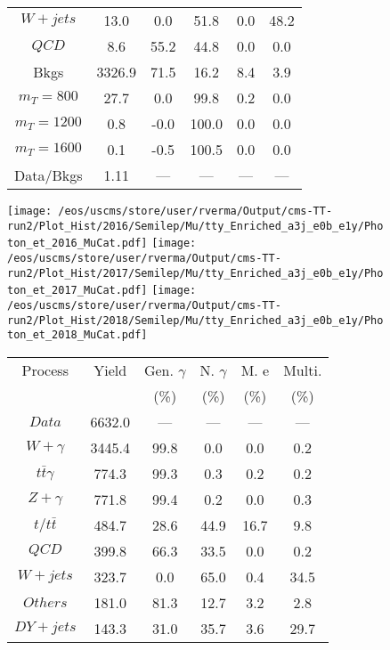 \begin{figure}
\begin{minipage}[c]{0.32\textwidth}
{\begin{tabular}{cccccc}
$ W+jets $ &  13.0 &  0.0 &  51.8 &  0.0 &  48.2\\
$ QCD $ &  8.6 &  55.2 &  44.8 &  0.0 &  0.0\\
Bkgs &  3326.9 &  71.5 &  16.2 &  8.4 &  3.9\\
$ m_{T} = 800 $ &  27.7 &  0.0 &  99.8 &  0.2 &  0.0\\
$ m_{T} = 1200 $ &  0.8 &  -0.0 &  100.0 &  0.0 &  0.0\\
$ m_{T} = 1600 $ &  0.1 &  -0.5 &  100.5 &  0.0 &  0.0\\
Data/Bkgs &  1.11 &  --- &  --- &  --- &  ---\\
\hline
\end{tabular}
}
\end{minipage}
\end{figure}

\begin{figure}
\centering
\texttt{[image: /eos/uscms/store/user/rverma/Output/cms-TT-run2/Plot\_Hist/2016/Semilep/Mu/tty\_Enriched\_a3j\_e0b\_e1y/Photon\_et\_2016\_MuCat.pdf]}
\texttt{[image: /eos/uscms/store/user/rverma/Output/cms-TT-run2/Plot\_Hist/2017/Semilep/Mu/tty\_Enriched\_a3j\_e0b\_e1y/Photon\_et\_2017\_MuCat.pdf]}
\texttt{[image: /eos/uscms/store/user/rverma/Output/cms-TT-run2/Plot\_Hist/2018/Semilep/Mu/tty\_Enriched\_a3j\_e0b\_e1y/Photon\_et\_2018\_MuCat.pdf]}
\begin{minipage}[c]{0.32\textwidth}
\centering
\tiny{
\begin{tabular}{cccccc}
\hline
Process & Yield & Gen. $\gamma$ & N. $\gamma$ & M. e & Multi. \\
 &  & (\%) & (\%) & (\%) & (\%)  \\
\hline
                                                                      $ Data $ &  6632.0 &  --- &  --- &  --- &  ---\\
$ W+\gamma $ &  3445.4 &  99.8 &  0.0 &  0.0 &  0.2\\
$ t\bar{t}\gamma $ &  774.3 &  99.3 &  0.3 &  0.2 &  0.2\\
$ Z+\gamma $ &  771.8 &  99.4 &  0.2 &  0.0 &  0.3\\
$ t/t\bar{t} $ &  484.7 &  28.6 &  44.9 &  16.7 &  9.8\\
$ QCD $ &  399.8 &  66.3 &  33.5 &  0.0 &  0.2\\
$ W+jets $ &  323.7 &  0.0 &  65.0 &  0.4 &  34.5\\
$ Others $ &  181.0 &  81.3 &  12.7 &  3.2 &  2.8\\
$ DY+jets $ &  143.3 &  31.0 &  35.7 &  3.6 &  29.7\\

\end{tabular}}
\end{minipage}
\end{figure}
